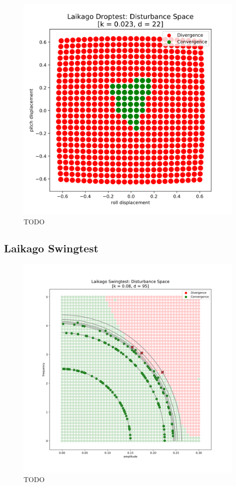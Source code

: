 \begin{figure}[h]
\begin{minipage}{0.33\textwidth}
        \end{minipage}
        \begin{minipage}{0.33\textwidth}
            \centering
            \includegraphics[width=\textwidth]{figures/droptest_ds_opt_v4.png} %
        \end{minipage}

    \caption{TODO}
    \end{figure}
    \newpage



    \subsection{Laikago Swingtest}
    \begin{figure}[h]\label{fig:}
    \centering
    \includegraphics[width=.7\linewidth]{figures/swingtest_ds_overay_v3.png}
    \caption{TODO}
    \end{figure}    

